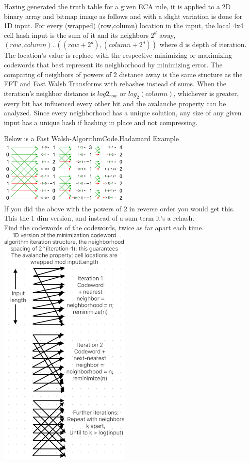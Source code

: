 \documentclass[11pt]{article}
\begin{document}
Having generated the truth table for a given ECA rule, it is applied to a 2D binary array and bitmap image as follows and with a slight variation is done for 1D input. For every (wrapped) (row,column) location in the input, the local 4x4 cell hash input is the sum of it and its neighbors $2^d$ away, $(row,column)..((row+2^d),(column+2^d))$ where d is depth of iteration. The location's value is replace with the respective minimizing or maximizing codewords that best represent its neighborhood by minimizing error. The comparing of neighbors of powers of 2 distance away is the same stucture as the FFT and Fast Walsh Transforms with rehashes instead of sums. When the iteration's neighbor distance is $log2_{row}$ or $log_2(column)$, whichever is greater, every bit has influenced every other bit and the avalanche property can be analyzed. Since every neighborhood has a unique solution, any size of any given input has a unique hash if hashing in place and not compressing.\\

\begin{center}
Below is a Fast Walsh-AlgorithmCode.Hadamard Example \cite{enwiki:1261916659}\\
\includegraphics{FastWalshHadamard}\\
If you did the above with the powers of 2 in reverse order you would get this. \\
This the 1 dim version, and instead of a sum term it's a rehash.\\ 
Find the codewords of the codewords, twice as far apart each time.\\
\includegraphics{AlgoStruct}\\
\end{center}
\end{document}
